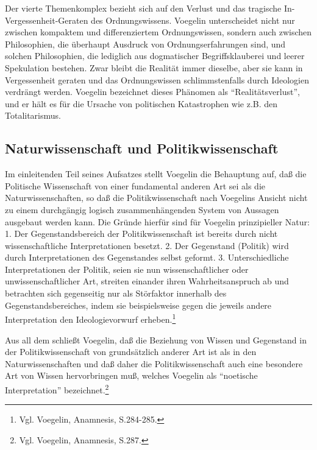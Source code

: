 Der vierte Themenkomplex bezieht sich auf den Verlust und das tragische
In-Vergessenheit-Geraten des Ordnungswissens. Voegelin unterscheidet
nicht nur zwischen kompaktem und differenziertem Ordnungswissen, sondern auch
zwischen Philosophien, die überhaupt Ausdruck von Ordnungserfahrungen sind,
und solchen Philosophien, die lediglich aus dogmatischer Begriffsklauberei
und leerer Spekulation bestehen. Zwar bleibt die Realität immer dieselbe,
aber sie kann in Vergessenheit geraten und das Ordnungswissen
schlimmstenfalls durch Ideologien verdrängt werden. Voegelin bezeichnet dieses
Phänomen als "`Realitätsverlust"', und er hält es für die Ursache von
politischen Katastrophen wie z.B. den Totalitarismus.


\subsection{Naturwissenschaft und Politikwissenschaft} 

Im einleitenden Teil seines Aufsatzes stellt Voegelin die Behauptung
auf, daß die Politische Wissenschaft von einer fundamental anderen Art
sei als die Naturwissenschaften, so daß die Politikwissenschaft nach
Voegelins Ansicht nicht zu einem durchgängig logisch zusammenhängenden
System von Aussagen ausgebaut werden kann.  Die Gründe hierfür sind für
Voegelin prinzipieller Natur: 1. Der Gegenstandsbereich der
Politikwissenschaft ist bereits durch nicht wissenschaftliche
Interpretationen besetzt. 2. Der Gegenstand (Politik) wird durch
Interpretationen des Gegenstandes selbst geformt. 3.  Unterschiedliche
Interpretationen der Politik, seien sie nun wissenschaftlicher oder
unwissenschaftlicher Art, streiten einander ihren Wahrheitsanspruch ab
und betrachten sich gegenseitig nur als Störfaktor innerhalb des
Gegenstandsbereiches, indem sie beispielsweise gegen die jeweils andere
Interpretation den Ideologievorwurf erheben.\footnote{Vgl. Voegelin,
  Anamnesis, S.284-285.}

Aus all dem schließt Voegelin, daß die Beziehung von Wissen und Gegenstand in
der Politikwissenschaft von grundsätzlich anderer Art ist als in den
Naturwissenschaften und daß daher die Politikwissenschaft auch eine besondere
Art von Wissen hervorbringen muß, welches Voegelin als "`noetische
Interpretation"' bezeichnet.\footnote{Vgl. Voegelin, Anamnesis, S.287.}

